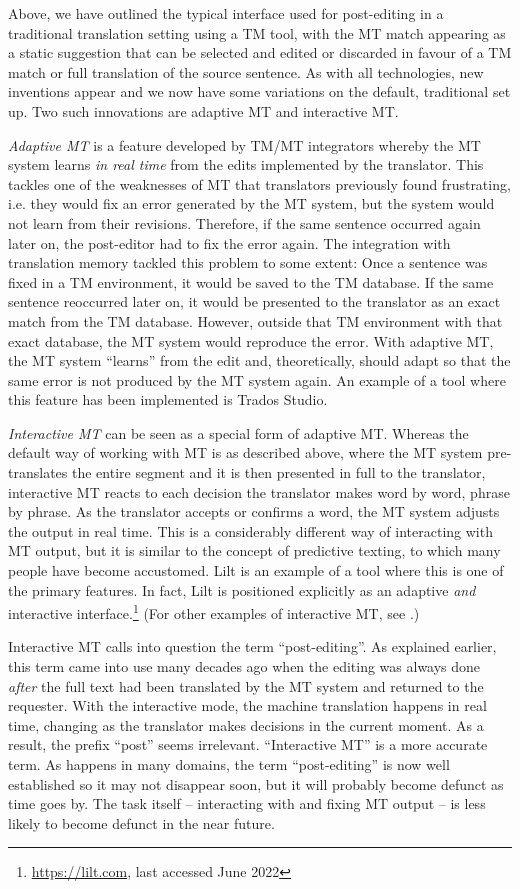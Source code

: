 \documentclass[output=paper,colorlinks,citecolor=brown]{langscibook}
\begin{document}
Above, we have outlined the typical interface used for post-editing in a traditional translation setting using a TM tool, with the MT match appearing as a static suggestion that can be selected and edited or discarded in favour of a TM match or full translation of the source sentence. As with all technologies, new inventions appear and we now have some variations on the default, traditional set up. Two such innovations are adaptive MT and interactive MT.

\textit{Adaptive MT} is a feature developed by TM/MT integrators whereby the MT system learns \textit{in real time} from the edits implemented by the translator. This tackles one of the weaknesses of MT that translators previously found frustrating, i.e. they would fix an error generated by the MT system, but the system would not learn from their revisions. Therefore, if the same sentence occurred again later on, the post-editor had to fix the error again. The integration with translation memory tackled this problem to some extent: Once a sentence was fixed in a TM environment, it would be saved to the TM database. If the same sentence reoccurred later on, it would be presented to the translator as an exact match from the TM database. However, outside that TM environment with that exact database, the MT system would reproduce the error. With adaptive MT, the MT system “learns” from the edit and, theoretically, should adapt so that the same error is not produced by the MT system again. An example of a tool where this feature has been implemented is Trados Studio.

\textit{Interactive MT} can be seen as a special form of adaptive MT. Whereas the default way of working with MT is as described above, where the MT system pre-translates the entire segment and it is then presented in full to the translator, interactive MT reacts to each decision the translator makes word by word, phrase by phrase. As the translator accepts or confirms a word, the MT system adjusts the output in real time. This is a considerably different way of interacting with MT output, but it is similar to the concept of predictive texting, to which many people have become accustomed. Lilt is an example of a tool where this is one of the primary features. In fact, Lilt is positioned explicitly as an adaptive \textit{and} interactive interface.\footnote{\url{https://lilt.com}, last accessed June 2022} (For other examples of interactive MT, see \citealt{TorregrosaRivero2018}.)

Interactive MT calls into question the term “post-editing”. As explained earlier, this term came into use many decades ago when the editing was always done \textit{after} the full text had been translated by the MT system and returned to the requester. With the interactive mode, the machine translation happens in real time, changing as the translator makes decisions in the current moment. As a result, the prefix “post” seems irrelevant. “Interactive MT” is a more accurate term. As happens in many domains, the term “post-editing” is now well established so it may not disappear soon, but it will probably become defunct as time goes by. The task itself – interacting with and fixing MT output – is less likely to become defunct in the near future.
\end{document}

